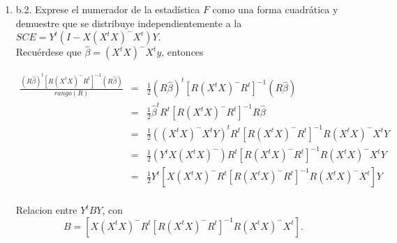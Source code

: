 \documentclass[12pt,a4paper]{report}
\begin{document}
\begin{itemize}
\begin{enumerate}
\begin{verbatim}
#simetrica
> simA<-all.equal(A,t(A))
> simA
[1] TRUE
> #Prueba de idempotencia
> A22<-A%*%A 
> Idem_A2 = all.equal(A, A22)
> Idem_A2
[1] TRUE
\end{verbatim}

entonces
\[\frac{Y^tAY}{\sigma^2} \sim \chi^2(5, \;(X\beta)^tA(X\beta)/2\sigma^2).\]

donde,

\begin{eqnarray*}
(X\beta)^tA(X\beta)
&=& [(X\beta)^t - (X\beta)^t X(X^tX)^{-}X^t](X\beta)\\
&=& \beta^t X^t X\beta - \beta^t (X^t X)(X^tX)^{-}(X^tX)\beta\\
&=& \beta^t X^t X\beta - \beta^t (X^t X)\beta\\
&=& 0.
\end{eqnarray*}

Por lo tanto, el parámetro de no centralidad, $(X\beta)^tA(X\beta)/2\sigma^2$, es igual a cero, lo que significa que 
\[\frac{Y^tAY}{\sigma^2} = \frac{Y^t[I - X(X^tX)^{-}X^t]Y}{\sigma^2}\] 
sigue una distribución chi cuadrada central con $5$ grados de libertad.
 
 
 
\item b.2. Exprese el numerador de la estadística $F$ como una forma cuadrática y demuestre que se distribuye independientemente a la $SCE=Y^t(I-X(X^tX)^-X^t)Y$.\\

Recuérdese que $\widehat{\beta}=(X^tX)^{-}X^ty$, entonces

\begin{eqnarray*}
\frac{(R\widehat{\beta})^t[R(X^tX)^{-}R^t]^{-1}(R\widehat{\beta})}{rango(R)} &=& \frac{1}{2}(R\widehat{\beta})^t[R(X^tX)^{-}R^t]^{-1}(R\widehat{\beta})\\
&=& \frac{1}{2}\widehat{\beta}^tR^t[R(X^tX)^{-}R^t]^{-1}R\widehat{\beta}\\
&=& \frac{1}{2}((X^tX)^{-}X^tY)^tR^t[R(X^tX)^{-}R^t]^{-1}R(X^tX)^{-}X^tY\\
&=& \frac{1}{2}(Y^tX(X^tX)^{-})R^t[R(X^tX)^{-}R^t]^{-1}R(X^tX)^{-}X^tY\\
&=& \frac{1}{2}Y^t[X(X^tX)^{-}R^t[R(X^tX)^{-}R^t]^{-1}R(X^tX)^{-}X^t]Y\\
\end{eqnarray*}


Relacion entre $Y^tBY$, con
\[B=[X(X^tX)^{-}R^t[R(X^tX)^{-}R^t]^{-1}R(X^tX)^{-}X^t].\]


\end{enumerate}
\end{itemize}
\end{document}
